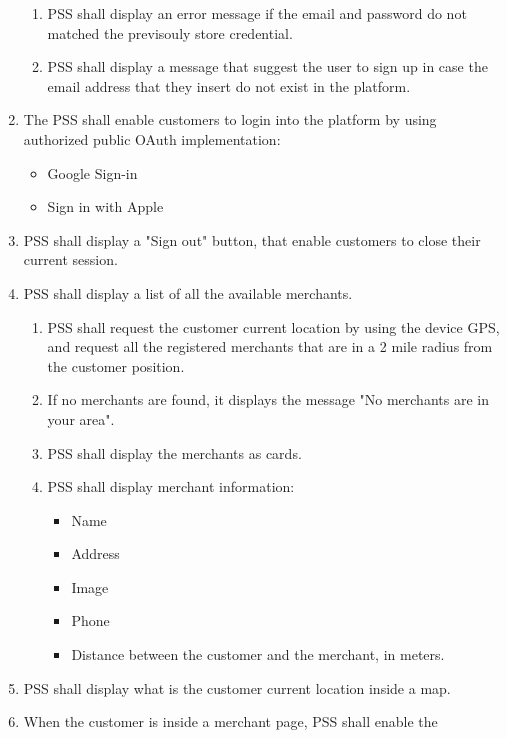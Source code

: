 \begin{enumerate}[label=SY-\arabic*]
\begin{enumerate}[label=SY-3.\arabic*]
        \item PSS shall display an error message if the email and password 
        do not matched the previsouly store credential.
        \item PSS shall display a message that suggest the user to sign up
        in case the email address that they insert do not exist in the 
        platform.
    \end{enumerate}
    \item The PSS shall enable customers to login into the platform by using 
    authorized public OAuth implementation:
    \begin{itemize}
        \item Google Sign-in \cite{google-sign-in}
        \item Sign in with Apple \cite{sign-in-with-apple}
    \end{itemize}
    \item PSS shall display a "Sign out" button, that enable customers to close 
    their current session.
    \item PSS shall display a list of all the available merchants.
    \begin{enumerate}[label=SY-6.\arabic*]
        \item PSS shall request the customer current location by using the 
        device GPS, and request all the registered merchants that are in a 
        2 mile radius from the customer position.
        \item If no merchants are found, it displays the message "No merchants 
        are in your area".
        \item PSS shall display the merchants as 
        cards. \cite{material-design-cards}
        \item PSS shall display merchant information: 
        \begin{itemize}
            \item Name
            \item Address
            \item Image
            \item Phone
            \item Distance between the customer and the merchant, in meters.
        \end{itemize}
    \end{enumerate}
    \item PSS shall display what is the customer current location 
    inside a map.
    \item When the customer is inside a merchant page, PSS shall enable the 

\end{enumerate}
